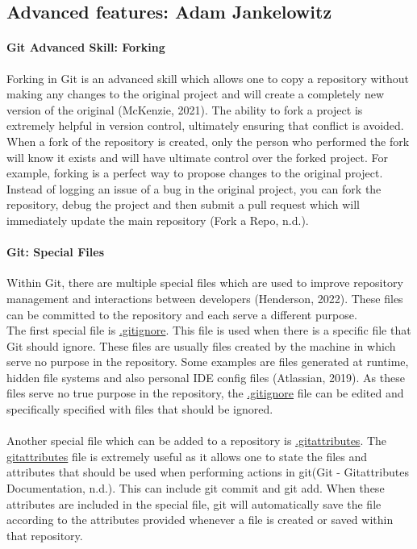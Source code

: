 \documentclass[a4paper, 11pt]{report}
\begin{document}
	\subsection{Advanced features: Adam Jankelowitz}
    \paragraph{Git Advanced Skill: Forking} Forking in Git is an advanced skill which allows one to copy a repository without making any changes to the original project and will create a completely new version of the original (McKenzie, 2021). The ability to fork a project is extremely helpful in version control, ultimately ensuring that conflict is avoided. When a fork of the repository is created, only the person who performed the fork will know it exists and will have ultimate control over the forked project. For example, forking is a perfect way to propose changes to the original project. Instead of logging an issue of a bug in the original project, you can fork the repository, debug the project and then submit a pull request which will immediately update the main repository (Fork a Repo, n.d.). 
    
    
    \paragraph{Git: Special Files} Within Git, there are multiple special files which are used to improve repository management and interactions between developers (Henderson, 2022). These files can be committed to the repository and each serve a different purpose. 
    \\
    The first special file is \underline{.gitignore}. This file is used when there is a specific file that Git should ignore. These files are usually files created by the machine in which serve no purpose in the repository. Some examples are files generated at runtime, hidden file systems and also personal IDE config files (Atlassian, 2019). As these files serve no true purpose in the repository, the \underline{.gitignore} file can be edited and specifically specified with files that should be ignored. 
    \\
    \\
    Another special file which can be added to a repository is \underline{.gitattributes}. The \underline{gitattributes} file is extremely useful as it allows one to state the files and attributes that should be used when performing actions in git(Git - Gitattributes Documentation, n.d.). This can include git commit and git add. When these attributes are included in the special file, git will automatically save the file according to the attributes provided whenever a file is created or saved within that repository. 
    \\
    \\
    
\end{document}
